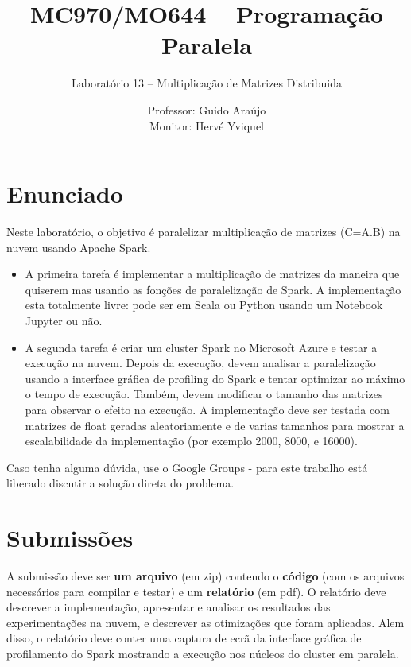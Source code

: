 \documentclass[a4paper,12pt]{scrartcl}
\begin{document}
\title{MC970/MO644 -- Programação Paralela}
\subtitle{Laboratório 13 -- Multiplicação de Matrizes Distribuida}
\author{Professor: Guido Araújo \\
			Monitor: Hervé Yviquel}
\date{}

\maketitle


\section{Enunciado}

Neste laboratório, o objetivo é paralelizar multiplicação de matrizes (C=A.B) na nuvem usando Apache Spark.

\begin{itemize}
	\item A primeira tarefa é implementar a multiplicação de matrizes da maneira que quiserem mas usando as fonções de paralelização de Spark. A implementação esta totalmente livre: pode ser em Scala ou Python usando um Notebook Jupyter ou não.
	\item A segunda tarefa é criar um cluster Spark no Microsoft Azure e testar a execução na nuvem. Depois da execução, devem analisar a paralelização usando a interface gráfica de profiling do Spark e tentar optimizar ao máximo o tempo de execução. Também, devem modificar o tamanho das matrizes para observar o efeito na execução. A implementação deve ser testada com matrizes de float geradas aleatoriamente e de varias tamanhos para mostrar a escalabilidade da implementação (por exemplo 2000, 8000, e 16000). 
\end{itemize}

Caso tenha alguma dúvida, use o Google Groups - para este trabalho está liberado discutir a solução direta do problema. 

\section{Submissões}

A submissão deve ser \textbf{um arquivo} (em zip) contendo o \textbf{código} (com os arquivos necessários para compilar e testar) e um \textbf{relatório} (em pdf). O relatório deve descrever a implementação, apresentar e analisar os resultados das experimentações na nuvem, e descrever as otimizações que foram aplicadas. Alem disso, o relatório deve conter uma captura de ecrã da interface gráfica de profilamento do Spark mostrando a execução nos núcleos do cluster em paralela.
\end{document}
